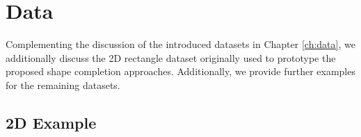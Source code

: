 \chapter{Data}
\label{ch:appendix-data}

Complementing the discussion of the introduced datasets in Chapter
\ref{ch:data}, we additionally discuss the 2D rectangle dataset originally
used to prototype the proposed shape completion approaches.
Additionally, we provide further examples for the remaining datasets.

\section{2D Example}
\label{sec:appendix-data-2d}

